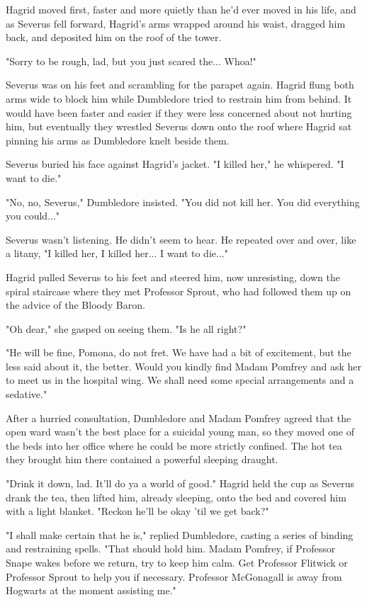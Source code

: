 Hagrid moved first, faster and more quietly than he'd ever moved in his life, and as Severus fell forward, Hagrid's arms wrapped around his waist, dragged him back, and deposited him on the roof of the tower.

"Sorry to be rough, lad, but you just scared the... Whoa!"

Severus was on his feet and scrambling for the parapet again. Hagrid flung both arms wide to block him while Dumbledore tried to restrain him from behind. It would have been faster and easier if they were less concerned about not hurting him, but eventually they wrestled Severus down onto the roof where Hagrid sat pinning his arms as Dumbledore knelt beside them.

Severus buried his face against Hagrid's jacket. "I killed her," he whispered. "I want to die."

"No, no, Severus," Dumbledore insisted. "You did not kill her. You did everything you could..."

Severus wasn't listening. He didn't seem to hear. He repeated over and over, like a litany, "I killed her, I killed her... I want to die..."

Hagrid pulled Severus to his feet and steered him, now unresisting, down the spiral staircase where they met Professor Sprout, who had followed them up on the advice of the Bloody Baron.

"Oh dear," she gasped on seeing them. "Is he all right?"

"He will be fine, Pomona, do not fret. We have had a bit of excitement, but the less said about it, the better. Would you kindly find Madam Pomfrey and ask her to meet us in the hospital wing. We shall need some special arrangements and a sedative."

After a hurried consultation, Dumbledore and Madam Pomfrey agreed that the open ward wasn't the best place for a suicidal young man, so they moved one of the beds into her office where he could be more strictly confined. The hot tea they brought him there contained a powerful sleeping draught.

"Drink it down, lad. It'll do ya a world of good." Hagrid held the cup as Severus drank the tea, then lifted him, already sleeping, onto the bed and covered him with a light blanket. "Reckon he'll be okay 'til we get back?"

"I shall make certain that he is," replied Dumbledore, casting a series of binding and restraining spells. "That should hold him. Madam Pomfrey, if Professor Snape wakes before we return, try to keep him calm. Get Professor Flitwick or Professor Sprout to help you if necessary. Professor McGonagall is away from Hogwarts at the moment assisting me."

